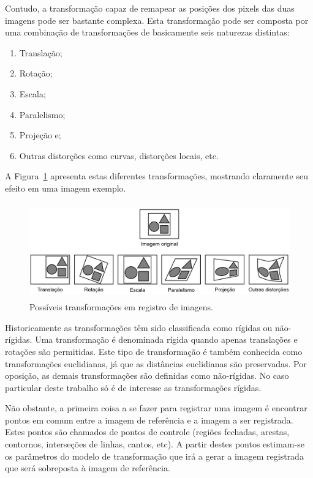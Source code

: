 Contudo, a transformação capaz de remapear as posições dos pixels das
duas imagens pode ser bastante complexa. Esta transformação pode ser
composta por uma combinação de transformações de basicamente seis
naturezas distintas:

\begin{enumerate}[label=$\triangleright$]
  \item Translação;
  \item Rotação;
  \item Escala;
  \item Paralelismo;
  \item Projeção e;
  \item Outras distorções como curvas, distorções locais, etc.\cite{52}
\end{enumerate}

A Figura~\ref{fig:posiv-transf} apresenta estas diferentes
transformações, mostrando claramente seu efeito em uma imagem exemplo.

\begin{figure} [h]
  \begin{center}
    \includegraphics[height=117pt,width=350pt]{images/fig_posiv-transf}
    \caption{Possíveis transformações em registro de
      imagens.\cite{52}}\label{fig:posiv-transf}
  \end{center}
\end{figure}

Historicamente as transformações têm sido classificada como rígidas ou
não-rígidas. Uma transformação é denominada rígida quando apenas
translações e rotações são permitidas. Este tipo de transformação é
também conhecida como transformações euclidianas, já que as distâncias
euclidianas são preservadas. Por oposição, as demais transformações
são definidas como não-rígidas.\cite{52} No caso particular deste
trabalho só é de interesse as transformações rígidas.

Não obstante, a primeira coisa a se fazer para registrar uma imagem é
encontrar pontos em comum entre a imagem de referência e a imagem a
ser registrada. Estes pontos são chamados de pontos de controle
(regiões fechadas, arestas, contornos, interseções de linhas, cantos,
etc). A partir destes pontos estimam-se os parâmetros do modelo de
transformação que irá a gerar a imagem registrada que será sobreposta
à imagem de referência.\cite{76}


